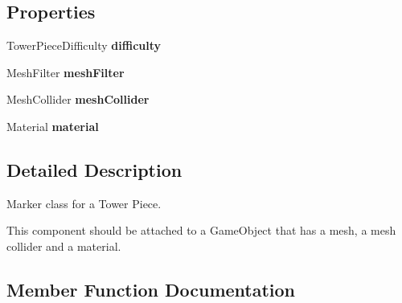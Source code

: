 \subsection*{Properties}
\begin{DoxyCompactItemize}
\item 
Tower\+Piece\+Difficulty {\bfseries difficulty}\hypertarget{class_tower_v_r_1_1_tower_piece_a80a1261ef724785a25d02a36cf26f7a1}{}\label{class_tower_v_r_1_1_tower_piece_a80a1261ef724785a25d02a36cf26f7a1}

\item 
Mesh\+Filter {\bfseries mesh\+Filter}\hypertarget{class_tower_v_r_1_1_tower_piece_a6cd90f25eb69ac26afcc1c13c4fe7054}{}\label{class_tower_v_r_1_1_tower_piece_a6cd90f25eb69ac26afcc1c13c4fe7054}

\item 
Mesh\+Collider {\bfseries mesh\+Collider}\hypertarget{class_tower_v_r_1_1_tower_piece_a2165bbc9011d19cc2afc87b6400200a1}{}\label{class_tower_v_r_1_1_tower_piece_a2165bbc9011d19cc2afc87b6400200a1}

\item 
Material {\bfseries material}\hypertarget{class_tower_v_r_1_1_tower_piece_a87cc9ad884bd6a1bcff5fd6ed809314b}{}\label{class_tower_v_r_1_1_tower_piece_a87cc9ad884bd6a1bcff5fd6ed809314b}

\end{DoxyCompactItemize}


\subsection{Detailed Description}
Marker class for a Tower Piece.

This component should be attached to a Game\+Object that has a mesh, a mesh collider and a material. 

\subsection{Member Function Documentation}

